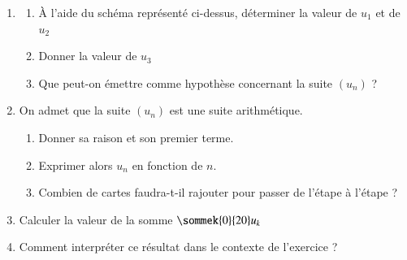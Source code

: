 \documentclass[oneside,12pt]{article}          %
\begin{document}
\begin{enumerate}
	\item \begin{enumerate}
		\item À l'aide du schéma représenté ci-dessus, déterminer la valeur de $u_1$ et de $u_2$
		\item Donner la valeur de $u_3$
		\item Que peut-on émettre comme hypothèse concernant la suite $(u_n)$ ?
	\end{enumerate}
	\item On admet que la suite $(u_n)$ est une suite arithmétique.
	\begin{enumerate}
		\item Donner sa raison et son premier terme.
		\item Exprimer alors $u_n$ en fonction de $n$.
		\item Combien de cartes faudra-t-il rajouter pour passer de l'étape  à l'étape  ?
	\end{enumerate}
	\item Calculer la valeur de la somme $\sommek{0}{20}u_k$
	\item Comment interpréter ce résultat dans le contexte de l'exercice ?
\end{enumerate}
\end{document}
